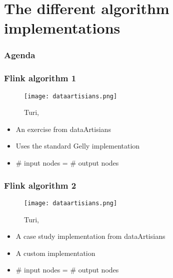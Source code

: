 \section{The different algorithm implementations}

\begin{frame}
\frametitle{Agenda}
\tableofcontents[currentsection]
\end{frame}


\begin{frame}
\frametitle{Flink algorithm 1}
\begin{figure}
	
	\texttt{[image: dataartisians.png]}
	\caption{Turi, \cite{turi}}
\end{figure}
\begin{itemize}
\item An exercise from dataArtisians
\item Uses the standard Gelly implementation
\item \# input nodes = \# output nodes
\end{itemize}
\end{frame}

\begin{frame}
\frametitle{Flink algorithm 2}
\begin{figure}
	
	\texttt{[image: dataartisians.png]}
	\caption{Turi, \cite{turi}}
\end{figure}

\begin{itemize}
\item A case study implementation from dataArtisians
\item A custom implementation
\item \# input nodes = \# output nodes
\end{itemize}
\end{frame}


